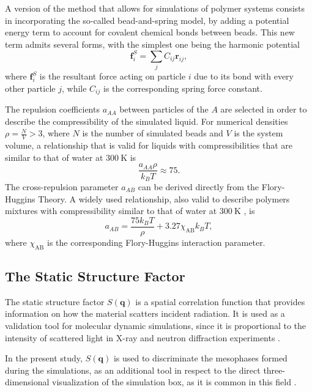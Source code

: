 \documentclass[
journal=mamobx,
manuscript=article,
]{achemso}
\newcommand{\vt}[1]{\boldsymbol{\mathbf{#1}}}          %
\begin{document}
A version of the method that allows for simulations of polymer systems consists in incorporating the so-called bead-and-spring model, by adding a potential energy term to account for covalent chemical bonds between beads.
This new term admits several forms, with the simplest one being the harmonic potential
\begin{equation}
{\vt f}_i^S = \sum_j C_{ij} {\vt r}_{ij},
\end{equation}
where ${\vt f}_i^S$ is the resultant force acting on particle $i$ due to its bond with every other particle $j$, while $C_{ij}$ is the corresponding spring force constant.

The repulsion coefficients $a_{AA}$ between particles of the $A$ are selected in order to describe the compressibility of the simulated liquid.
For numerical densities $\rho = \frac{N}{V} > 3$, where $N$ is the number of simulated beads and $V$ is the system volume, a relationship that is valid for liquids with compressibilities that are similar to that of water at $300~\mathrm{K}$ is \cite{Groot_1997}
\begin{equation}
\label{eq:like-particle repulsive parameter}
\frac{a_{AA} \rho}{k_B T} \approx 75.
\end{equation}
The cross-repulsion parameter $a_{AB}$ can be derived directly from the Flory-Huggins Theory.
A widely used relationship, also valid to describe polymers mixtures with compressibility similar to that of water at $300~\mathrm{K}$ \cite{Groot_1998, Martinez-Veracoechea_2006, Martinez-Veracoechea_2009, Gavrilov_2013}, is
\begin{equation}
\label{eq:unlike-particle repulsive parameter}
a_{AB} = \frac{75 k_B T}{\rho} + 3.27 \chi_\mathrm{AB} k_B T,
\end{equation}
where $\chi_\mathrm{AB}$ is the corresponding Flory-Huggins interaction parameter.

\subsection{The Static Structure Factor}

The static structure factor $S(\vt q)$ is a spatial correlation function that provides information on how the material scatters incident radiation.
It is used as a validation tool for molecular dynamic simulations, since it is proportional to the intensity of scattered light in X-ray and neutron diffraction experiments \cite{Hansen_2013}.

In the present study, $S(\vt q)$ is used to discriminate the mesophases formed during the simulations, as an additional tool in respect to the direct three-dimensional visualization of the simulation box, as it is common in this field \cite{Martinez-Veracoechea_2005, Gavrilov_2013, Lemos_2020}.
\end{document}

